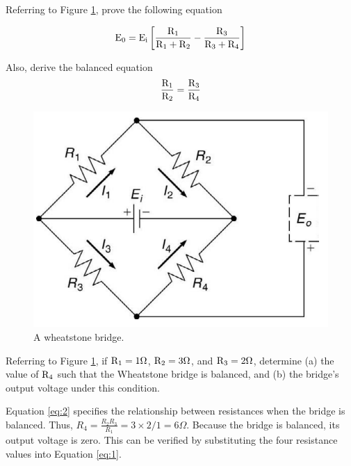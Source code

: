 \documentclass[a4paper,11pt,dvipsnames]{book}
\begin{document}
\begin{question}

Referring to Figure \ref{fig:wheatstone}, prove the following equation

\begin{equation} \label{eq:1}
 {\rm E_0 = E_i \left[ \frac{R_1}{R_1+R_2} - \frac{R_3}{R_3+R_4} \right]}
\end{equation}

Also, derive the balanced equation 
\begin{equation} \label{eq:2}
 {\rm \frac{R_1}{R_2} = \frac{R_3}{R_4} }
\end{equation}

\begin{figure}[t!]
\centering
\includegraphics[scale=0.6]{wheatstone}
\caption{A wheatstone bridge.}\label{fig:wheatstone}
\end{figure}
\examspace{8em}

\end{question}
\begin{solution}

\end{solution}


\begin{question}

Referring to Figure \ref{fig:wheatstone}, if ${\rm R_1 = 1 \Omega}$, ${\rm R_2 = 3 \Omega}$, and ${\rm R_3 = 2 \Omega}$,
determine (a) the value of ${\rm R_4}$ such that the Wheatstone bridge is balanced, and (b) the bridge’s output voltage under this condition.

\end{question}
\begin{solution}

Equation \ref{eq:2} specifies the relationship between resistances when the bridge is balanced. Thus, $R_4 = \frac{R_2 R_3}{R_1} = 3 \times 2 / 1 = 6 \Omega$. Because the bridge is balanced, its output voltage is zero. This can be verified by substituting the four resistance values into Equation \ref{eq:1}.

\end{solution}
\end{document}
